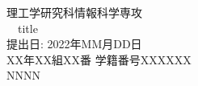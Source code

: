 \documentclass{jarticle}
\begin{document}
\thispagestyle{empty}
\begin{center}
  \vspace*{1cm}
  \LARGE
  理工学研究科情報科学専攻 \\
  \vspace{1cm}
　title \\
  \vspace{5cm}
  提出日: 2022年MM月DD日 \\
  \vspace{2cm}
  XX年XX組XX番 学籍番号XXXXXX\\
  \vspace{2cm}
  NNNN

\end{center}
\end{document}
